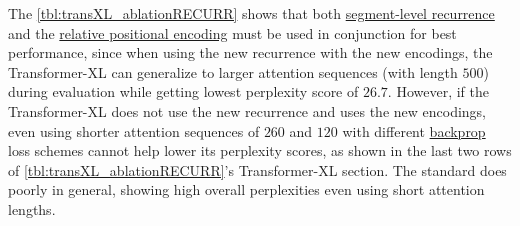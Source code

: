 The \cref{tbl:transXL_ablationRECURR} shows that both \hyperref[sec:SegmentLevelRec]{segment-level recurrence} and the \hyperref[sec:RelativePosEnc]{relative positional encoding} must be used in conjunction for best performance, since when using the new recurrence with the new encodings, the Transformer-XL can generalize to larger attention sequences (with length $500$) during evaluation while getting lowest perplexity score of $26.7$. However, if the Transformer-XL does not use the new recurrence and uses the new encodings, even using shorter attention sequences of $260$ and $120$ with different \hyperref[sec:BackwardProp]{backprop} loss schemes cannot help lower its perplexity scores, as shown in the last two rows of \cref{tbl:transXL_ablationRECURR}'s Transformer-XL section. The standard  does poorly in general, showing high overall perplexities even using short attention lengths. 
